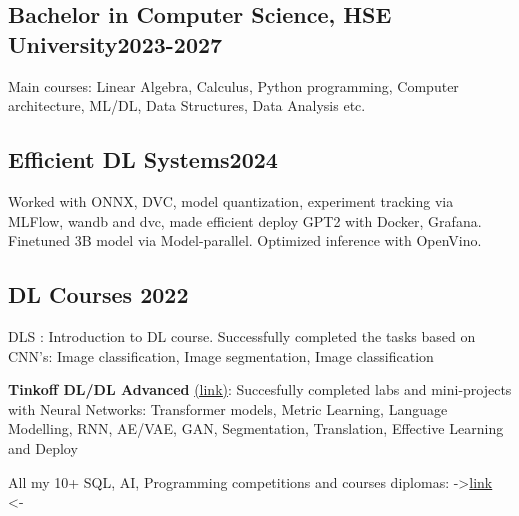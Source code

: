 
\subsection{{Bachelor in Computer Science, HSE University}\hfill 2023-2027}
\vspace*{3pt}
Main courses: Linear Algebra, Calculus, Python programming, Computer architecture, ML/DL, Data Structures, Data Analysis etc.
\vspace*{6pt}


\subsection{{Efficient DL Systems}\hfill 2024}
\vspace*{3pt}
Worked with ONNX, DVC, model quantization, experiment tracking via MLFlow, wandb and dvc, made efficient deploy GPT2 with Docker, Grafana. Finetuned 3B model via Model-parallel. Optimized inference with OpenVino. 

\vspace*{6pt}

\subsection{{DL Courses }\hfill 2022}
\begin{zitemize}
\item DLS : Introduction to DL course. Successfully completed the tasks based on CNN's: Image classification, Image segmentation, Image classification
\item \textbf{Tinkoff DL/DL Advanced} \href{https://github.com/Slavikss/tinkoff_DL}{(link)}: Succesfully completed labs and mini-projects with Neural Networks: Transformer models, Metric Learning, Language Modelling, RNN, AE/VAE, GAN, Segmentation, Translation, Effective Learning and Deploy
\item All my 10+ SQL, AI, Programming competitions and courses diplomas: ->\href{https://github.com/Slavikss/CVs/tree/master/diplomas/IT}{link} <-
\end{zitemize}




